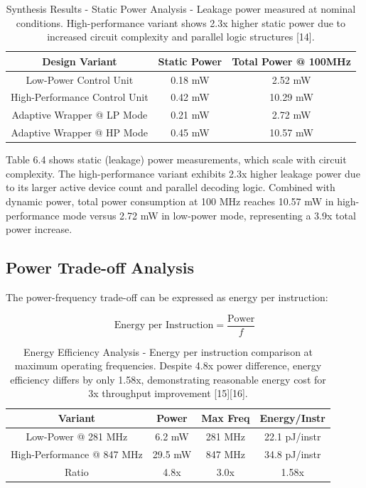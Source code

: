 \documentclass[15pt,a4paper]{report}
\begin{document}
\begin{table}[H]
    \centering
    \begin{tabular}{|c|c|c|}
        \hline
        \textbf{Design Variant} & \textbf{Static Power} & \textbf{Total Power @ 100MHz} \\
        \hline
        Low-Power Control Unit & 0.18 mW & 2.52 mW \\
        \hline
        High-Performance Control Unit & 0.42 mW & 10.29 mW \\
        \hline
        Adaptive Wrapper @ LP Mode & 0.21 mW & 2.72 mW \\
        \hline
        Adaptive Wrapper @ HP Mode & 0.45 mW & 10.57 mW \\
        \hline
    \end{tabular}
    \label{tab:power_static}
    \caption{Synthesis Results - Static Power Analysis - Leakage power measured at nominal conditions. High-performance variant shows 2.3x higher static power due to increased circuit complexity and parallel logic structures [14].}
\end{table}

Table 6.4 shows static (leakage) power measurements, which scale with circuit complexity. The high-performance variant exhibits 2.3x higher leakage power due to its larger active device count and parallel decoding logic. Combined with dynamic power, total power consumption at 100 MHz reaches 10.57 mW in high-performance mode versus 2.72 mW in low-power mode, representing a 3.9x total power increase.

\subsection{Power Trade-off Analysis}

The power-frequency trade-off can be expressed as energy per instruction:

\begin{equation}
\text{Energy per Instruction} = \frac{\text{Power}}{f}
\end{equation}

\begin{table}[H]
    \centering
    \begin{tabular}{|c|c|c|c|}
        \hline
        \textbf{Variant} & \textbf{Power} & \textbf{Max Freq} & \textbf{Energy/Instr} \\
        \hline
        Low-Power @ 281 MHz & 6.2 mW & 281 MHz & 22.1 pJ/instr \\
        \hline
        High-Performance @ 847 MHz & 29.5 mW & 847 MHz & 34.8 pJ/instr \\
        \hline
        Ratio & 4.8x & 3.0x & 1.58x \\
        \hline
    \end{tabular}
    \label{tab:energy_analysis}
    \caption{Energy Efficiency Analysis - Energy per instruction comparison at maximum operating frequencies. Despite 4.8x power difference, energy efficiency differs by only 1.58x, demonstrating reasonable energy cost for 3x throughput improvement [15][16].}
\end{table}
\end{document}
